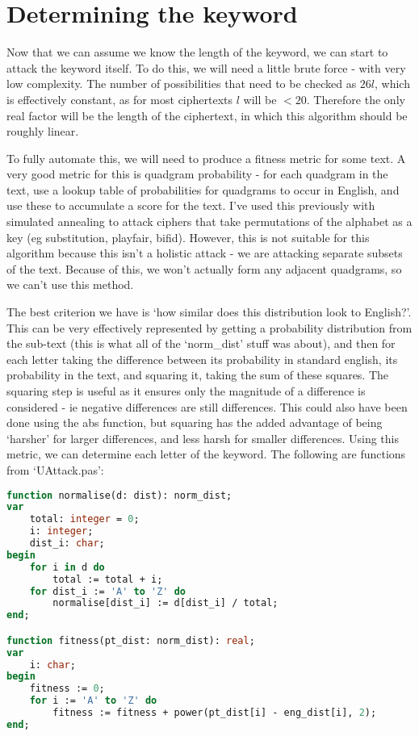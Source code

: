 \documentclass{article}
\begin{document}
    \section{Determining the keyword}

    Now that we can assume we know the length of the keyword, we can start to
    attack the keyword itself. To do this, we will need a little brute force -
    with very low complexity. The number of possibilities that need to be
    checked as $26l$, which is effectively constant, as for most ciphertexts
    $l$ will be $< 20$. Therefore the only real factor will be the length of
    the ciphertext, in which this algorithm should be roughly linear.

    To fully automate this, we will need to produce a fitness metric for some
    text. A very good metric for this is quadgram probability - for each
    quadgram in the text, use a lookup table of probabilities for quadgrams to
    occur in English, and use these to accumulate a score for the text. I've
    used this previously with simulated annealing to attack ciphers that take
    permutations of the alphabet as a key (eg substitution, playfair, bifid).
    However, this is not suitable for this algorithm because this isn't a
    holistic attack - we are attacking separate subsets of the text. Because of
    this, we won't actually form any adjacent quadgrams, so we can't use this
    method.

    The best criterion we have is `how similar does this distribution look to
    English?'. This can be very effectively represented by getting a
    probability distribution from the sub-text (this is what all of the
    `norm\_dist' stuff was about), and then for each letter taking the
    difference between its probability in standard english, its probability in
    the text, and squaring it, taking the sum of these squares. The squaring
    step is useful as it ensures only the magnitude of a difference is
    considered - ie negative differences are still differences. This could also
    have been done using the abs function, but squaring has the added advantage
    of being `harsher' for larger differences, and less harsh for smaller
    differences. Using this metric, we can determine each letter of the
    keyword. The following are functions from `UAttack.pas':

\begin{lstlisting}[language=Pascal, caption=Fitness library functions]
function normalise(d: dist): norm_dist;
var
    total: integer = 0;
    i: integer;
    dist_i: char;
begin
    for i in d do
        total := total + i;
    for dist_i := 'A' to 'Z' do
        normalise[dist_i] := d[dist_i] / total;
end;

function fitness(pt_dist: norm_dist): real;
var
    i: char;
begin
    fitness := 0;
    for i := 'A' to 'Z' do
        fitness := fitness + power(pt_dist[i] - eng_dist[i], 2);
end;
\end{lstlisting}
\end{document}
